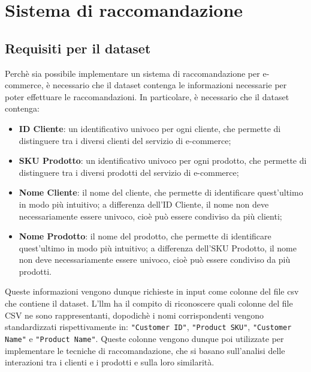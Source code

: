 \chapter{Sistema di raccomandazione}
\label{cap:sistema-raccomandazione}


\section{Requisiti per il dataset}

Perchè sia possibile implementare un sistema di raccomandazione per e-commerce, è necessario che il dataset contenga le informazioni necessarie per poter effettuare le raccomandazioni. In particolare, è necessario che il dataset contenga:
\begin{itemize}
    \item \textbf{ID Cliente}: un identificativo univoco per ogni cliente, che permette di distinguere tra i diversi clienti del servizio di e-commerce;
    \item \textbf{SKU Prodotto}: un identificativo univoco per ogni prodotto, che permette di distinguere tra i diversi prodotti del servizio di e-commerce;
    \item \textbf{Nome Cliente}: il nome del cliente, che permette di identificare quest'ultimo in modo più intuitivo; a differenza dell'ID Cliente, il nome non deve necessariamente essere univoco, cioè può essere condiviso da più clienti;
    \item \textbf{Nome Prodotto}: il nome del prodotto, che permette di identificare quest'ultimo in modo più intuitivo; a differenza dell'SKU Prodotto, il nome non deve necessariamente essere univoco, cioè può essere condiviso da più prodotti.
\end{itemize}

Queste informazioni vengono dunque richieste in input come colonne del file \gls{csv} che contiene il dataset. L'\gls{llm} ha il compito di riconoscere quali colonne del file CSV ne sono rappresentanti, dopodichè i nomi corrispondenti vengono standardizzati rispettivamente in: \texttt{"Customer ID"}, \texttt{"Product SKU"}, \texttt{"Customer Name"} e \texttt{"Product Name"}. Queste colonne vengono dunque poi utilizzate per implementare le tecniche di raccomandazione, che si basano sull'analisi delle interazioni tra i clienti e i prodotti e sulla loro similarità.


